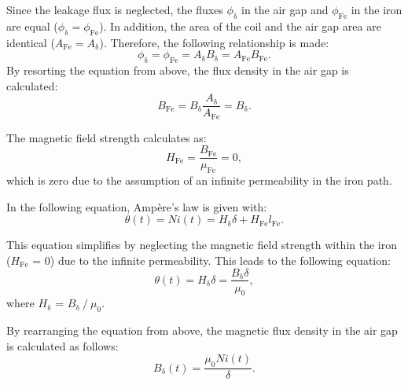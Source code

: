 \begin{solutionblock}

    Since the leakage flux is neglected, the fluxes $\phi_{\mathrm{\updelta}}$ in the air gap and $\phi_{\mathrm{Fe}}$ in the iron are equal ($\phi_{\mathrm{\updelta}} = \phi_{\mathrm{Fe}}$). In addition, the area of the coil and the air gap area are identical ($A_{\mathrm{Fe}} = A_{\mathrm{\updelta}}$).
    Therefore, the following relationship is made:
    \begin{equation}
        \phi_{\mathrm{\updelta}} = \phi_{\mathrm{Fe}}
        = A_{\mathrm{\updelta}} B_{\mathrm{\updelta}}
        = A_{\mathrm{Fe}} B_{\mathrm{Fe}}.
    \end{equation}
    By resorting the equation from above, the flux density in the air gap is calculated:
    \begin{equation}
        B_{\mathrm{Fe}} = B_{\mathrm{\updelta}} \frac{A_{\mathrm{\updelta}}}{A_{\mathrm{Fe}}} = B_{\mathrm{\updelta}}.
    \end{equation}
    
    The magnetic field strength calculates as:
    \begin{equation}
        H_{\mathrm{Fe}} = \frac{B_{\mathrm{Fe}}}{\mu_{\mathrm{Fe}}} = 0,
    \end{equation}
    which is zero due to the assumption of an infinite permeability in the iron path.

    In the following equation, Ampère's law is given with:
    \begin{equation}
        \theta(t) = N i(t)
        = H_{\mathrm{\updelta}} \delta + H_{\mathrm{Fe}} l_{\mathrm{Fe}}.
    \end{equation}
        
    This equation simplifies by neglecting the magnetic field strength within the iron ($H_{\mathrm{Fe}}$ = 0) due to the infinite permeability. This leads to the following equation:
    \begin{equation}
        \theta(t) = H_{\mathrm{\updelta}} \delta
        = \frac{B_{\mathrm{\updelta}} \delta}{\mu_{\mathrm{0}}},
    \end{equation}
    where $H_{\updelta}$ = $B_{\updelta} \ / \ \mu_{\mathrm{0}}$.

    By rearranging the equation from above, the magnetic flux density in the air gap is calculated as follows:
    \begin{equation}
        B_{\mathrm{\updelta}}(t) = \frac{\mu_{\mathrm{0}} N i(t)}{\delta}.
    \end{equation}
    

\end{solutionblock}
